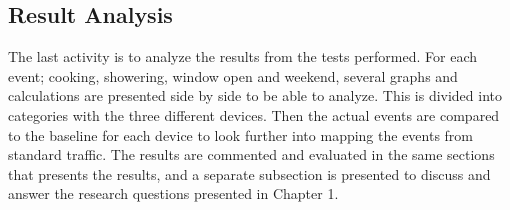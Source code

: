 \subsection{Result Analysis}
The last activity is to analyze the results from the tests performed. For each event; cooking, showering, window open and weekend, several graphs and calculations are presented side by side to be able to analyze. This is divided into categories with the three different devices. Then the actual events are compared to the baseline for each device to look further into mapping the events from standard traffic. The results are commented and evaluated in the same sections that presents the results, and a separate subsection is presented to discuss and answer the research questions presented in Chapter 1. 